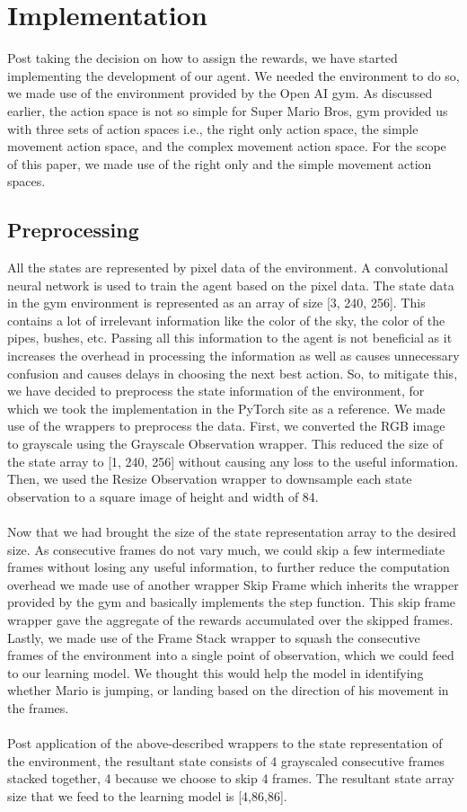 \documentclass[conference]{IEEEtran}
\theoremstyle{definition}
\begin{document}
\section{Implementation}
Post taking the decision on how to assign the rewards, we have started implementing the development of our agent. We needed the environment to do so, we made use of the environment provided by the Open AI gym. As discussed earlier, the action space is not so simple for Super Mario Bros, gym provided us with three sets of action spaces i.e., the right only action space, the simple movement action space, and the complex movement action space. For the scope of this paper, we made use of the right only and the simple movement action spaces. 

\subsection{Preprocessing}
All the states are represented by pixel data of the environment. A convolutional neural network is used to train the agent based on the pixel data. The state data in the gym environment is represented as an array of size [3, 240, 256]. This contains a lot of irrelevant information like the color of the sky, the color of the pipes, bushes, etc. Passing all this information to the agent is not beneficial as it increases the overhead in processing the information as well as causes unnecessary confusion and causes delays in choosing the next best action. So, to mitigate this, we have decided to preprocess the state information of the environment, for which we took the implementation in the PyTorch\cite{pytorch} site as a reference. We made use of the wrappers to preprocess the data. First, we converted the RGB image to grayscale using the Grayscale Observation wrapper. This reduced the size of the state array to [1, 240, 256] without causing any loss to the useful information. Then, we used the Resize Observation wrapper to downsample each state observation to a square image of height and width of 84. 
\\
\\
Now that we had brought the size of the state representation array to the desired size. As consecutive frames do not vary much, we could skip a few intermediate frames without losing any useful information, to further reduce the computation overhead we made use of another wrapper Skip Frame which inherits the wrapper provided by the gym and basically implements the step function. This skip frame wrapper gave the aggregate of the rewards accumulated over the skipped frames. Lastly, we made use of the Frame Stack wrapper to squash the consecutive frames of the environment into a single point of observation, which we could feed to our learning model. We thought this would help the model in identifying whether Mario is jumping, or landing based on the direction of his movement in the frames.
\\
\\
Post application of the above-described wrappers to the state representation of the environment, the resultant state consists of 4 grayscaled consecutive frames stacked together, 4 because we choose to skip 4 frames. The resultant state array size that we feed to the learning model is [4,86,86].
\end{document}
